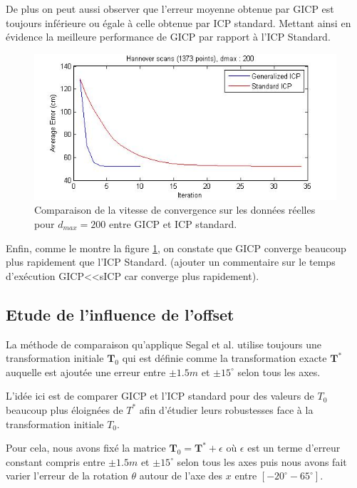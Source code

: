 De plus on peut aussi observer que l'erreur moyenne obtenue par GICP est toujours inférieure ou égale à celle obtenue par ICP standard. Mettant ainsi en évidence la meilleure performance de GICP par rapport à l'ICP Standard.\\

\begin{figure}[!h]
     \centering
     \includegraphics[scale=0.4]{Images/Resultats/hannover_dmax200_diffconvergence.jpg}
     \caption{Comparaison de la vitesse de convergence sur les données réelles pour $d_{max}=200$ entre GICP et ICP standard.}
	\label{fig:GICP_convergence}
\end{figure}

Enfin, comme le montre la figure \ref{fig:GICP_convergence}, on constate que GICP converge beaucoup plus rapidement que l'ICP Standard. (ajouter un commentaire sur le temps d'exécution GICP<<sICP car converge plus rapidement).
   
\subsection{Etude de l'influence de l'offset}

La méthode de comparaison qu'applique Segal et al. utilise toujours une transformation initiale $\mathbf{T}_0$ qui est définie comme la transformation exacte $\mathbf{T}^*$ auquelle est ajoutée une erreur entre $\pm1.5m$ et $\pm15^{\circ}$ selon tous les axes. 

L'idée ici est de comparer GICP et l'ICP standard pour des valeurs de $T_0$ beaucoup plus éloignées de $T^*$ afin d'étudier leurs robustesses face à la transformation initiale $T_0$.

Pour cela, nous avons fixé la matrice $\mathbf{T}_0=\mathbf{T}^*+\epsilon $ où $\epsilon$ est un terme d'erreur constant compris entre $\pm1.5m$ et $\pm15^{\circ}$ selon tous les axes puis nous avons fait varier l'erreur de la rotation $\theta$ autour de l'axe des $x$ entre $[-20^{\circ} -65^{\circ}]$.


